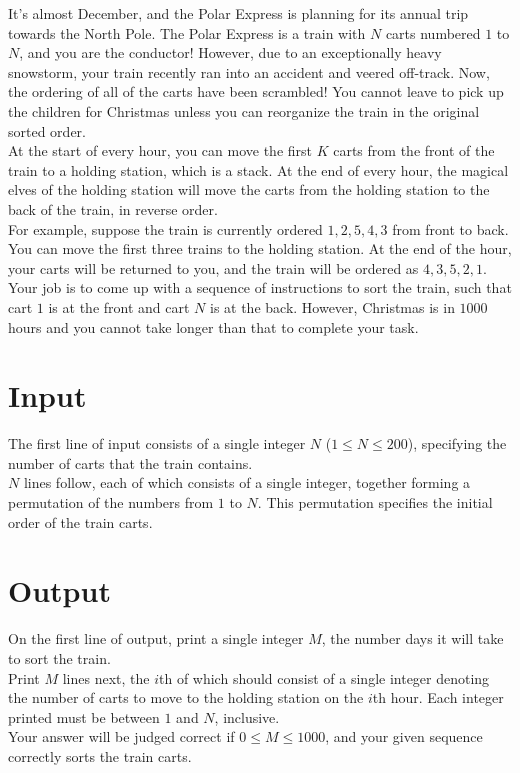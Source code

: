 
\noindent It's almost December, and the Polar Express is planning for its annual trip towards the North Pole. The Polar Express is a train with $N$ carts numbered $1$ to $N$, and you are the conductor! However, due to an exceptionally heavy snowstorm, your train recently ran into an accident and veered off-track. Now, the ordering of all of the carts have been scrambled! You cannot leave to pick up the children for Christmas unless you can reorganize the train in the original sorted order.\\

At the start of every hour, you can move the first $K$ carts from the front of the train to a holding station, which is a stack. At the end of every hour, the magical elves of the holding station will move the carts from the holding station to the back of the train, in reverse order.\\

For example, suppose the train is currently ordered $1, 2, 5, 4, 3$ from front to back. You can move the first three trains to the holding station. At the end of the hour, your carts will be returned to you, and the train will be ordered as $4, 3, 5, 2, 1$.\\

Your job is to come up with a sequence of instructions to sort the train, such that cart $1$ is at the front and cart $N$ is at the back. However, Christmas is in $1000$ hours and you cannot take longer than that to complete your task.

\section*{Input}
The first line of input consists of a single integer $N$ ($1 \leq N \leq 200$), specifying the number of carts that the train contains.\\
$N$ lines follow, each of which consists of a single integer, together forming a permutation of the numbers from $1$ to $N$. This permutation specifies the initial order of the train carts.

\section*{Output}
On the first line of output, print a single integer $M$, the number days it will take to sort the train.\\
Print $M$ lines next, the $i$th of which should consist of a single integer denoting the number of carts to move to the holding station on the $i$th hour. Each integer printed must be between $1$ and $N$, inclusive.\\
Your answer will be judged correct if $0 \leq M \leq 1000$, and your given sequence correctly sorts the train carts.\\
